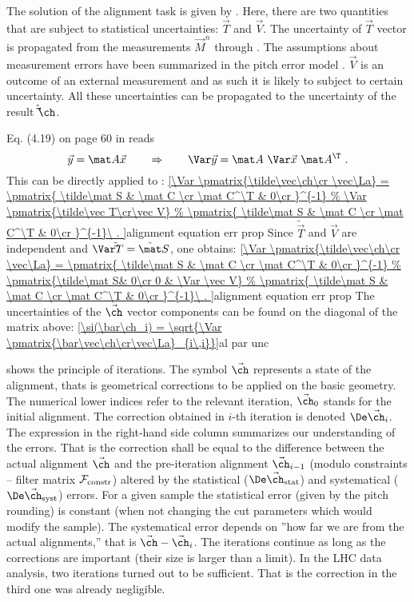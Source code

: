 
The solution of the alignment task is given by . Here, there are two quantities that are subject to statistical uncertainties: $\vec T$ and $\vec V$. The uncertainty of $\vec T$ vector is propagated from the measurements $\vec M^n$ through . The assumptions about measurement errors have been summarized in the pitch error model . $\vec V$ is an outcome of an external measurement and as such it is likely to subject to certain uncertainty. All these uncertainties can be propagated to the uncertainty of the result $\hat\vec\ch$.

Eq\hbox{.} (4.19) on page 60 in  reads
$$\vec y = \mat A\vec x \qquad \Rightarrow \qquad \Var\vec y = \mat A\ \Var\vec x\ \mat A^\T\ .$$
This can be directly applied to :
\eqref{\Var \pmatrix{\tilde\vec\ch\cr \vec\La} = 
\pmatrix{
\tilde\mat S & \mat C \cr
\mat C^\T & 0\cr
}^{-1}
%
\Var \pmatrix{\tilde\vec T\cr\vec V}
%
\pmatrix{
\tilde\mat S & \mat C \cr
\mat C^\T & 0\cr
}^{-1}\ .
}{alignment equation err prop}
Since $\tilde\vec T$ and $\vec V$ are independent and $\Var \tilde\vec T = \tilde\mat S$, one obtains:
\eqref{\Var \pmatrix{\tilde\vec\ch\cr \vec\La} = 
\pmatrix{
\tilde\mat S & \mat C \cr
\mat C^\T & 0\cr
}^{-1}
%
\pmatrix{\tilde\mat S& 0\cr 0 & \Var \vec V}
%
\pmatrix{
\tilde\mat S & \mat C \cr
\mat C^\T & 0\cr
}^{-1}\ .
}{alignment equation err prop}
The uncertainties of the $\vec\ch$ vector components can be found on the diagonal of the matrix above:
\eqref{\si(\bar\ch_i) = \sqrt{\Var \pmatrix{\bar\vec\ch\cr\vec\La}_{i\,i}}}{al par unc}


 shows the principle of iterations. The symbol $\vec\ch$ represents a state of the alignment, thats is geometrical corrections to be applied on the basic geometry. The numerical lower indices refer to the relevant iteration, $\vec\ch_0$ stands for the initial alignment. The correction obtained in $i$-th iteration is denoted $\De \vec\ch_i$. The expression in the right-hand side column summarizes our understanding of the errors. That is the correction shall be equal to the difference between the actual alignment $\vec\ch$ and the pre-iteration alignment $\vec\ch_{i-1}$ (modulo constraints -- filter matrix ${\cal F}_{\rm constr}$) altered by the statistical ($\De \vec\ch_{\rm stat}$) and systematical ($\De \vec\ch_{\rm syst}$) errors. For a given sample the statistical error (given by the pitch rounding) is constant (when not changing the cut parameters which would modify the sample). The systematical error depends on ''how far we are from the actual alignments,'' that is $\vec\ch - \vec\ch_i$. The iterations continue as long as the corrections are important (their size is larger than a limit). In the LHC data analysis, two iterations turned out to be sufficient. That is the correction in the third one was already negligible.


